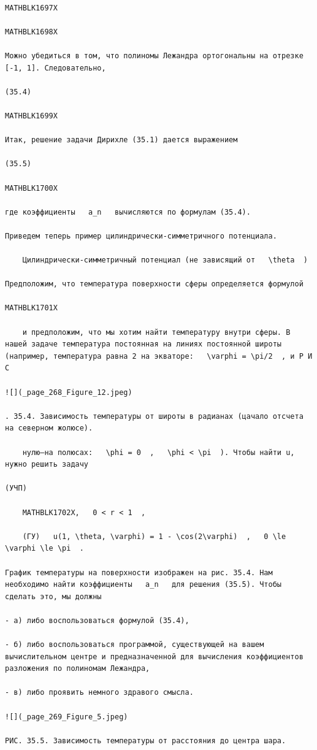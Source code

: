 \documentclass[
]{article}
\begin{document}
\begin{verbatim}

MATHBLK1697X

MATHBLK1698X

Можно убедиться в том, что полиномы Лежандра ортогональны на отрезке [-1, 1]. Следовательно,

(35.4)

MATHBLK1699X

Итак, решение задачи Дирихле (35.1) дается выражением

(35.5)

MATHBLK1700X

где коэффициенты   a_n   вычисляются по формулам (35.4).

Приведем теперь пример цилиндрически-симметричного потенциала.

    Цилиндрически-симметричный потенциал (не зависящий от   \theta  )

Предположим, что температура поверхности сферы определяется формулой

MATHBLK1701X

    и предположим, что мы хотим найти температуру внутри сферы. В нашей задаче температура постоянная на линиях постоянной широты (например, температура равна 2 на экваторе:   \varphi = \pi/2  , и Р И С

![](_page_268_Figure_12.jpeg)

. 35.4. Зависимость температуры от широты в радианах (цачало отсчета на северном жолюсе).

    нулю—на полюсах:   \phi = 0  ,   \phi < \pi  ). Чтобы найти u, нужно решить задачу

(УЧП)

    MATHBLK1702X,   0 < r < 1  ,

    (ГУ)   u(1, \theta, \varphi) = 1 - \cos(2\varphi)  ,   0 \le \varphi \le \pi  .

График температуры на поверхности изображен на рис. 35.4. Нам необходимо найти коэффициенты   a_n   для решения (35.5). Чтобы сделать это, мы должны

- а) либо воспользоваться формулой (35.4),

- б) либо воспользоваться программой, существующей на вашем вычислительном центре и предназначенной для вычисления коэффициентов разложения по полиномам Лежандра,

- в) либо проявить немного здравого смысла.

![](_page_269_Figure_5.jpeg)

РИС. 35.5. Зависимость температуры от расстояния до центра шара.


\end{verbatim}
\end{document}
